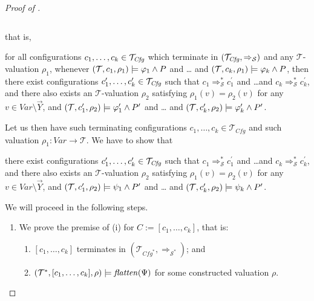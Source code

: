 \begin{proof}[Proof of ]
\begin{enumerate}
\begin{proofenv}
\begin{equation*}
        \end{equation*}
    \end{proofenv}
    that is,
    \begin{proofenv}
        for all configurations $c_1,\ldots,c_k \in \mathcal{T}_{\mathit{Cfg}}$
        which terminate in $(\mathcal{T}_{\mathit{Cfg}}, \Rightarrow_{\mathcal{S}})$
        and any $\mathcal{T}$-valuation $\rho_1$,
        whenever $(\mathcal{T}, c_1,\rho_1) \models \varphi_1 \land P$ and \ldots
        and $(\mathcal{T}, c_k,\rho_1) \models \varphi_k \land P$,
        then there exist configurations $c_1^\prime,\ldots,c_k^\prime \in \mathcal{T}_{\mathit{Cfg}}$
        such that $c_1 \Rightarrow^{*}_{\mathcal{S}} c_1^\prime$
        and \ldots and $c_k \Rightarrow^{*}_{\mathcal{S}} c_k^\prime$,
        and there also exists an $\mathcal{T}$-valuation $\rho_2$
        satisfying $\rho_1(v) = \rho_2(v)$ for any $v \in \mathit{Var} \setminus \vec{Y}$,
        and
        $(\mathcal{T}, c_1^\prime,\rho_2) \models \varphi^\prime_1 \land P^\prime$ and \ldots
        and $(\mathcal{T}, c_k^\prime, \rho_2) \models \varphi^\prime_k \land P^\prime$.
    \end{proofenv}
    Let us then have such terminating configurations $c_1,\ldots,c_k \in \mathcal{T}_{\mathit{Cfg}}$
    and such valuation $\rho_1 : \mathit{Var} \to \mathcal{T}$.
    We have to show that
    \begin{proofenv}
        there exist configurations $c_1^\prime,\ldots,c_k^\prime \in \mathcal{T}_{\mathit{Cfg}}$
        such that $c_1 \Rightarrow^{*}_{\mathcal{S}} c_1^\prime$
        and \ldots and $c_k \Rightarrow^{*}_{\mathcal{S}} c_k^\prime$,
        and there also exists an $\mathcal{T}$-valuation $\rho_2$
        satisfying $\rho_1(v) = \rho_2(v)$ for any $v \in \mathit{Var} \setminus \vec{Y}$,
        and
        $(\mathcal{T}, c_1^\prime,\rho_2) \models \psi_1 \land P^\prime$ and \ldots
        and $(\mathcal{T}, c_k^\prime, \rho_2) \models \psi_k \land P^\prime$.
    \end{proofenv}
    We will proceed in the following steps.
    \begin{enumerate}
        \item We prove the premise of (i) for $C := [c_1,\ldots,c_k]$, that is:
        \begin{enumerate}
            \item $[c_1,\ldots,c_k]$ terminates in $(\mathcal{T}_{\mathit{Cfg}^*}, \Rightarrow_{\mathcal{S}^*})$; and
            \item $(\mathcal{T}^*, [c_1,\ldots,c_k], \rho) \models \mathit{flatten}(\Psi)$ for some constructed valuation $\rho$.

\end{enumerate}
\end{enumerate}
\end{enumerate}
\end{proof}
